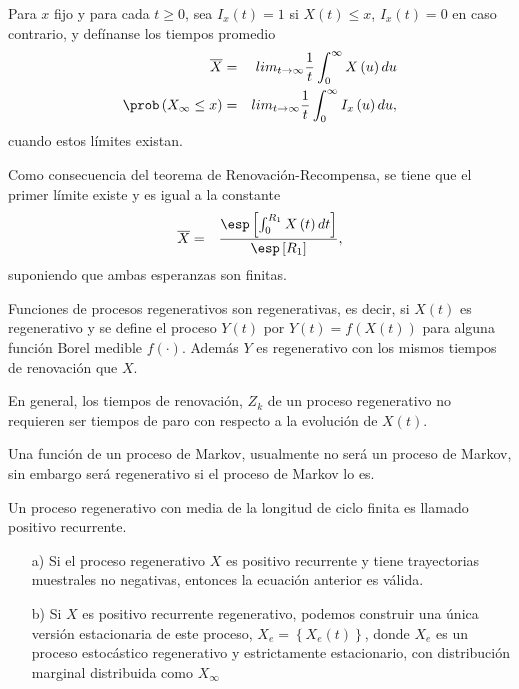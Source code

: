 \begin{Def}
Para $x$ fijo y para cada $t\geq0$, sea $I_{x}\left(t\right)=1$ si $X\left(t\right)\leq x$,  $I_{x}\left(t\right)=0$ en caso contrario, y def\'inanse los tiempos promedio
\begin{eqnarray*}
\overline{X}&=&lim_{t\rightarrow\infty}\frac{1}{t}\int_{0}^{\infty}X\left(u\right)du\\
\prob\left(X_{\infty}\leq x\right)&=&lim_{t\rightarrow\infty}\frac{1}{t}\int_{0}^{\infty}I_{x}\left(u\right)du,
\end{eqnarray*}
cuando estos l\'imites existan.
\end{Def}

Como consecuencia del teorema de Renovaci\'on-Recompensa, se tiene que el primer l\'imite  existe y es igual a la constante
\begin{eqnarray*}
\overline{X}&=&\frac{\esp\left[\int_{0}^{R_{1}}X\left(t\right)dt\right]}{\esp\left[R_{1}\right]},
\end{eqnarray*}
suponiendo que ambas esperanzas son finitas.
 
\begin{Note}
Funciones de procesos regenerativos son regenerativas, es decir, si $X\left(t\right)$ es regenerativo y se define el proceso $Y\left(t\right)$ por $Y\left(t\right)=f\left(X\left(t\right)\right)$ para alguna funci\'on Borel medible $f\left(\cdot\right)$. Adem\'as $Y$ es regenerativo con los mismos tiempos de renovaci\'on que $X$. 

En general, los tiempos de renovaci\'on, $Z_{k}$ de un proceso regenerativo no requieren ser tiempos de paro con respecto a la evoluci\'on de $X\left(t\right)$.
\end{Note} 

\begin{Note}
Una funci\'on de un proceso de Markov, usualmente no ser\'a un proceso de Markov, sin embargo ser\'a regenerativo si el proceso de Markov lo es.
\end{Note}

 
\begin{Note}
Un proceso regenerativo con media de la longitud de ciclo finita es llamado positivo recurrente.
\end{Note}


\begin{Note}
\begin{itemize}
\item[a)] Si el proceso regenerativo $X$ es positivo recurrente y tiene trayectorias muestrales no negativas, entonces la ecuaci\'on anterior es v\'alida.
\item[b)] Si $X$ es positivo recurrente regenerativo, podemos construir una \'unica versi\'on estacionaria de este proceso, $X_{e}=\left\{X_{e}\left(t\right)\right\}$, donde $X_{e}$ es un proceso estoc\'astico regenerativo y estrictamente estacionario, con distribuci\'on marginal distribuida como $X_{\infty}$
\end{itemize}
\end{Note}


